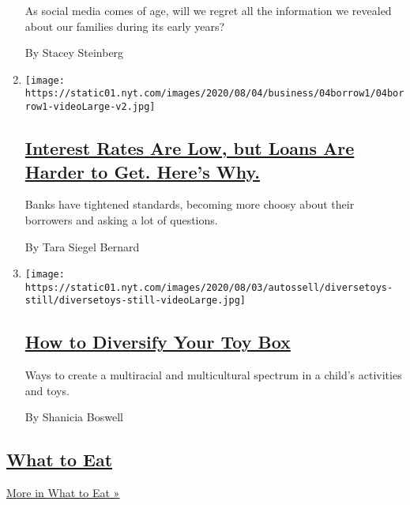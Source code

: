 \begin{enumerate}
  As social media comes of age, will we regret all the information we
  revealed about our families during its early years?

  By Stacey Steinberg
\item
  \texttt{[image: https://static01.nyt.com/images/2020/08/04/business/04borrow1/04borrow1-videoLarge-v2.jpg]}

  \hypertarget{interest-rates-are-low-but-loans-are-harder-to-get-heres-why}{%
  \subsection{\texorpdfstring{\href{/2020/08/04/your-money/mortgage-loans-credit-cards-coronavirus.html}{Interest
  Rates Are Low, but Loans Are Harder to Get. Here's
  Why.}}{Interest Rates Are Low, but Loans Are Harder to Get. Here's Why.}}\label{interest-rates-are-low-but-loans-are-harder-to-get-heres-why}}

  Banks have tightened standards, becoming more choosy about their
  borrowers and asking a lot of questions.

  By Tara Siegel Bernard
\item
  \texttt{[image: https://static01.nyt.com/images/2020/08/03/autossell/diversetoys-still/diversetoys-still-videoLarge.jpg]}

  \hypertarget{how-to-diversify-your-toy-box}{%
  \subsection{\texorpdfstring{\href{/2020/08/03/parenting/multiracial-toys-diversity-play.html}{How
  to Diversify Your Toy
  Box}}{How to Diversify Your Toy Box}}\label{how-to-diversify-your-toy-box}}

  Ways to create a multiracial and multicultural spectrum in a child's
  activities and toys.

  By Shanicia Boswell
\end{enumerate}

\hypertarget{what-to-eat}{%
\subsection{\texorpdfstring{\href{/spotlight/what-to-eat}{What to
Eat}}{What to Eat}}\label{what-to-eat}}

\href{/spotlight/what-to-eat}{More in What to Eat »}

